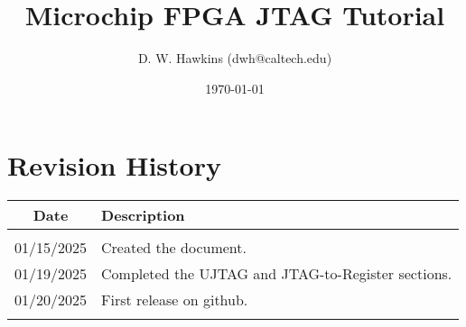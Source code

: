 \documentclass[10pt,twoside]{article}
\begin{document}
\title{Microchip FPGA JTAG Tutorial}
\author{D. W. Hawkins (dwh@caltech.edu)}
\date{\today}

\maketitle

\tableofcontents

\pagestyle{fancy}

\clearpage

%

\clearpage

\clearpage

\clearpage


\clearpage
\appendix
\section{Revision History}
%
\begin{table}[h]
\begin{center}
\begin{tabular}{|c|p{100mm}|}
\hline
Date & Description\\
\hline\hline
&\\
01/15/2025  & Created the document.\\
01/19/2025  & Completed the UJTAG and JTAG-to-Register sections.\\
01/20/2025  & First release on github.\\
&\\
\hline
\end{tabular}
\end{center}
\end{table}

%
%



\end{document}
